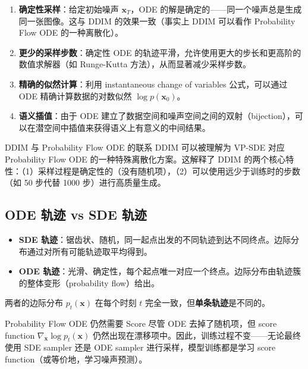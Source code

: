 \begin{enumerate}
    \item \textbf{确定性采样}：给定初始噪声 $\mathbf{x}_T$，ODE 的解是确定的——同一个噪声总是生成同一张图像。这与 DDIM 的效果一致（事实上 DDIM 可以看作 Probability Flow ODE 的一种离散化）。
    \item \textbf{更少的采样步数}：确定性 ODE 的轨迹平滑，允许使用更大的步长和更高阶的数值求解器（如 Runge-Kutta 方法），从而显著减少采样步数。
    \item \textbf{精确的似然计算}：利用 instantaneous change of variables 公式，可以通过 ODE 精确计算数据的对数似然 $\log p(\mathbf{x}_0)$。
    \item \textbf{语义插值}：由于 ODE 建立了数据空间和噪声空间之间的双射（bijection），可以在潜空间中插值来获得语义上有意义的中间结果。
\end{enumerate}

\begin{knowledgebox}{DDIM 与 Probability Flow ODE 的联系}
DDIM 可以被理解为 VP-SDE 对应 Probability Flow ODE 的一种特殊离散化方案。这解释了 DDIM 的两个核心特性：（1）采样过程是确定性的（没有随机项），（2）可以使用远少于训练时的步数（如 50 步代替 1000 步）进行高质量生成。
\end{knowledgebox}

\subsection{ODE 轨迹 vs SDE 轨迹}

\begin{itemize}
    \item \textbf{SDE 轨迹}：锯齿状、随机，同一起点出发的不同轨迹到达不同终点。边际分布通过对所有可能轨迹取平均得到。
    \item \textbf{ODE 轨迹}：光滑、确定性，每个起点唯一对应一个终点。边际分布由轨迹簇的整体变形（probability flow）给出。
\end{itemize}

两者的边际分布 $p_t(\mathbf{x})$ 在每个时刻 $t$ 完全一致，但\textbf{单条轨迹}是不同的。

\begin{warningbox}{Probability Flow ODE 仍然需要 Score}
尽管 ODE 去掉了随机项，但 score function $\nabla_{\mathbf{x}} \log p_t(\mathbf{x})$ 仍然出现在漂移项中。因此，训练过程不变——无论最终使用 SDE sampler 还是 ODE sampler 进行采样，模型训练都是学习 score function（或等价地，学习噪声预测）。
\end{warningbox}

